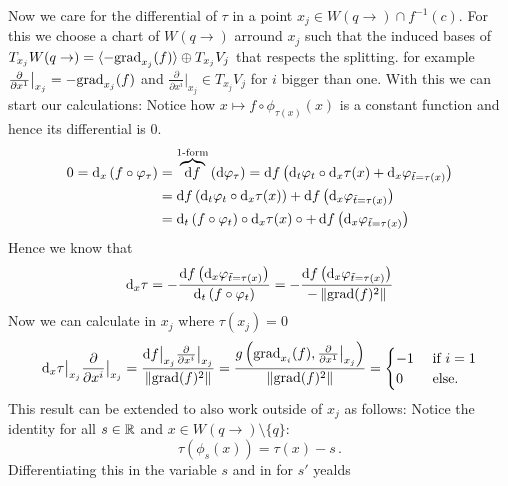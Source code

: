 \begin{remark}
	Now we care for the differential of $\tau$ in a point $x_j\in W(q\to)\cap f^{-1}(c)$. For this we choose a chart of $W(q\to)$ arround $x_j$ such that the induced bases of $T_{x_j}W(q\to)=\langle -\mathrm{grad}_{x_j}(f)\rangle \oplus T_{x_j}V_j$ that respects the splitting. for example $\frac{\partial}{ \partial x^1}\big|_{x_j}= -\mathrm{grad}_{x_j}(f) $ and $\frac{\partial}{ \partial x^i}\big|_{x_j}\in T_{x_j}V_j$ for $i$ bigger than one. With this we can start our calculations:
	Notice how $x\mapsto f\circ \phi_{\tau(x)}(x)$ is a constant function and hence its differential is $0$.
	\begin{align*}
		0=\diff_x\left(f\circ \phi_{\tau}\right)&=\overbrace{\diff f }^{1\text{-form}}\left( \diff\phi_\tau\right)=\diff f \left( \diff_t \phi_t \circ\diff_x\tau(x)+\diff_x\phi_{\tilde{t}=\tau(x)}\right)\\
		&=\diff f \left( \diff_t \phi_t\circ \diff_x\tau(x)\right)+\diff f \left( \diff_x\phi_{\tilde{t}=\tau(x)}\right)\\
		&=\diff_t \left(f \circ\phi_t \right) \circ\diff_x\tau(x)\circ  +\diff f \left( \diff_x\phi_{\tilde{t}=\tau(x)} \right)
	\end{align*}
	Hence we know that
	\begin{equation}\label{eq: differential of tau}
		\mathop{}\!\mathrm{d}_x \tau =-\frac{\mathop{}\!\mathrm{d} f \left( \mathop{}\!\mathrm{d}_x\varphi_{\tilde{t}=\tau(x)} \right)}{\mathop{}\!\mathrm{d}_t \left(f \circ\varphi_t \right)}=-\frac{\mathop{}\!\mathrm{d} f \left( \mathop{}\!\mathrm{d}_x\varphi_{\tilde{t}=\tau(x)} \right)}{-\left\lVert\mathrm{grad}(f)^2\right\rVert}
	\end{equation}  Now we can calculate in $x_j$ where $\tau(x_j)=0$
	\begin{align*}
		\mathop{}\!\mathrm{d}_x \tau \big|_{x_j}\frac{\partial}{ \partial x^i}\big|_{x_j}
		=\frac{
			\mathop{}\!\mathrm{d} f \big|_{x_j} \frac{\partial}{ \partial x^i}\big|_{x_j}}
		{\left\lVert\mathrm{grad}(f)^2\right\rVert}
		=\frac{
			g\left(\mathrm{grad}_{x_i}(f), \frac{\partial}{ \partial x^1}\big|_{x_j}\right)}
		{\left\lVert\mathrm{grad}(f)^2\right\rVert}=
		\begin{cases}
			-1 & \text{ if }i=1\\
			0 & \text{ else. }
		\end{cases}
	\end{align*}
	This result can be extended to also work outside of $x_j$ as follows: Notice the identity for all $s\in \mathbb{R}$ and $x\in W(q\to)\setminus \{q\}$:
	\begin{equation*}
		\tau(\phi_s(x))=\tau(x)-s\,.
	\end{equation*} Differentiating this in the variable $s$ and in for $s'$ yealds

\end{remark}

